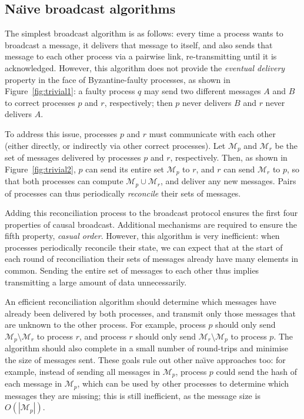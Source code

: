 \documentclass[a4paper,anonymous,USenglish]{lipics-v2019}
\begin{document}
\subsection{Na\"{\i}ve broadcast algorithms}

The simplest broadcast algorithm is as follows: every time a process wants to broadcast a message, it delivers that message to itself, and also sends that message to each other process via a pairwise link, re-transmitting until it is acknowledged.
However, this algorithm does not provide the \emph{eventual delivery} property in the face of Byzantine-faulty processes, as shown in Figure~\ref{fig:trivial1}: a faulty process $q$ may send two different messages $A$ and $B$ to correct processes $p$ and $r$, respectively; then $p$ never delivers $B$ and $r$ never delivers $A$.

To address this issue, processes $p$ and $r$ must communicate with each other (either directly, or indirectly via other correct processes).
Let $\mathcal{M}_p$ and $\mathcal{M}_r$ be the set of messages delivered by processes $p$ and $r$, respectively.
Then, as shown in Figure~\ref{fig:trivial2}, $p$ can send its entire set $\mathcal{M}_p$ to $r$, and $r$ can send $\mathcal{M}_r$ to $p$, so that both processes can compute $\mathcal{M}_p \cup \mathcal{M}_r$, and deliver any new messages.
Pairs of processes can thus periodically \emph{reconcile} their sets of messages.

Adding this reconciliation process to the broadcast protocol ensures the first four properties of causal broadcast.
Additional mechanisms are required to ensure the fifth property, \emph{casual order}.
However, this algorithm is very inefficient: when processes periodically reconcile their state, we can expect that at the start of each round of reconciliation their sets of messages already have many elements in common.
Sending the entire set of messages to each other thus implies transmitting a large amount of data unnecessarily.

An efficient reconciliation algorithm should determine which messages have already been delivered by both processes, and transmit only those messages that are unknown to the other process.
For example, process $p$ should only send $\mathcal{M}_p \setminus \mathcal{M}_r$ to process $r$, and process $r$ should only send $\mathcal{M}_r \setminus \mathcal{M}_p$ to process $p$.
The algorithm should also complete in a small number of round-trips and minimise the size of messages sent.
These goals rule out other na\"{\i}ve approaches too: for example, instead of sending all messages in $\mathcal{M}_p$, process $p$ could send the hash of each message in $\mathcal{M}_p$, which can be used by other processes to determine which messages they are missing; this is still inefficient, as the message size is $O(|\mathcal{M}_{p}|)$.
\end{document}
